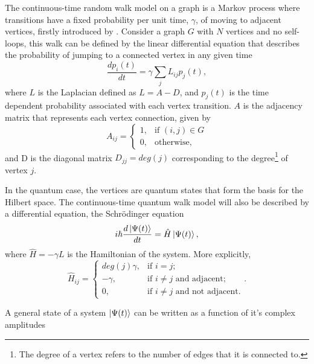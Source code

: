 \documentclass[../../dissertation.tex]{subfiles}
\begin{document}
The continuous-time random walk model on a graph is a Markov process where
transitions have a fixed probability per unit time, $\gamma$, of moving to
adjacent vertices, firstly introduced by \cite{montrollweiss1965}. Consider a
graph $G$ with $N$ vertices and no self-loops, this walk can be defined by the
linear differential equation that describes the probability of jumping to a
connected vertex in any given time 
\begin{equation}
	\frac{dp_i(t)}{dt} = \gamma \sum_j L_{ij} p_j(t), \label{eq:classicalContWalk}
\end{equation}
where $L$ is the Laplacian defined as $L = A - D$, and $p_j(t)$ is the time
dependent probability associated with each vertex transition. $A$ is the
adjacency matrix that represents each vertex connection, given by
\begin{equation}
	A_{ij} = \begin{cases} 1, & \mbox{if } (i,j)\in G \\ 0, & \mbox{otherwise,} \end{cases}
\end{equation}
and D is the diagonal matrix $D_{jj} = deg(j)$ corresponding to the
degree\footnote{The degree of a vertex refers to the number of edges that it is
connected to.} of vertex $j$.\par In the quantum case, the vertices are quantum
states that form the basis for the Hilbert space. The continuous-time quantum
walk model will also be described by a differential equation, the Schrödinger
equation
\begin{equation}
	i\hbar \frac{d\ket{\Psi(t)}}{dt} = \hat{H} \ket{\Psi(t)}, \label{shrodinger}
\end{equation}
where $\hat{H} = -\gamma L$ is the Hamiltonian of the system. More explicitly,
\begin{equation}
	\hat{H}_{ij} = \begin{cases} 
		deg(j)\gamma, & \mbox{if } i= j; \\ 
		-\gamma, & \mbox{if } i\neq j\mbox{ and adjacent};\\
		0, & \mbox{if } i\neq j\mbox{ and not adjacent}.
	\end{cases}.
	\label{Hamilt}
\end{equation}\par
A general state of a system $\ket{\Psi(t)}$ can be written as a function of
it's complex amplitudes 
\end{document}
